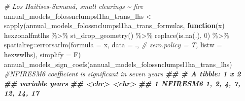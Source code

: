 \documentclass[10pt,landscape,a3paper]{article}
\newenvironment{Shaded}{\begin{snugshade}}{\end{snugshade}}
\newcommand{\AttributeTok}[1]{\textcolor[rgb]{0.77,0.63,0.00}{#1}}
\newcommand{\CommentTok}[1]{\textcolor[rgb]{0.56,0.35,0.01}{\textit{#1}}}
\newcommand{\ControlFlowTok}[1]{\textcolor[rgb]{0.13,0.29,0.53}{\textbf{#1}}}
\newcommand{\DecValTok}[1]{\textcolor[rgb]{0.00,0.00,0.81}{#1}}
\newcommand{\DocumentationTok}[1]{\textcolor[rgb]{0.56,0.35,0.01}{\textbf{\textit{#1}}}}
\newcommand{\FunctionTok}[1]{\textcolor[rgb]{0.00,0.00,0.00}{#1}}
\newcommand{\NormalTok}[1]{#1}
\newcommand{\OtherTok}[1]{\textcolor[rgb]{0.56,0.35,0.01}{#1}}
\newcommand{\SpecialCharTok}[1]{\textcolor[rgb]{0.00,0.00,0.00}{#1}}
\begin{document}
\begin{Shaded}
\begin{Highlighting}[]
\CommentTok{\# Los Haitises{-}Samaná, small clearings \textasciitilde{} fire}
\NormalTok{annual\_models\_folossnclumpsl1ha\_trans\_lhs }\OtherTok{\textless{}{-}} \FunctionTok{sapply}\NormalTok{(annual\_models\_folossnclumpsl1ha\_trans\_formulas,}
                        \ControlFlowTok{function}\NormalTok{(x)}
\NormalTok{                          hexzonalfmtlhs }\SpecialCharTok{\%\textgreater{}\%}
                          \FunctionTok{st\_drop\_geometry}\NormalTok{() }\SpecialCharTok{\%\textgreater{}\%}
                          \FunctionTok{replace}\NormalTok{(}\FunctionTok{is.na}\NormalTok{(.), }\DecValTok{0}\NormalTok{) }\SpecialCharTok{\%\textgreater{}\%}
\NormalTok{                          spatialreg}\SpecialCharTok{::}\FunctionTok{errorsarlm}\NormalTok{(}\AttributeTok{formula =}\NormalTok{ x,}
                                                 \AttributeTok{data =}\NormalTok{ ., }\CommentTok{\# zero.policy = T,}
                                                 \AttributeTok{listw =}\NormalTok{ hexwwlhs),}
                        \AttributeTok{simplify =}\NormalTok{ F)}
\FunctionTok{annual\_models\_sign\_coefs}\NormalTok{(annual\_models\_folossnclumpsl1ha\_trans\_lhs) }\CommentTok{\#NFIRESM6 coefficient is significant in seven years}
\DocumentationTok{\#\# \# A tibble: 1 x 2}
\DocumentationTok{\#\#   variable years                 }
\DocumentationTok{\#\#   \textless{}chr\textgreater{}    \textless{}chr\textgreater{}                 }
\DocumentationTok{\#\# 1 NFIRESM6 1, 2, 4, 7, 12, 14, 17}


\end{Highlighting}
\end{Shaded}
\end{document}
